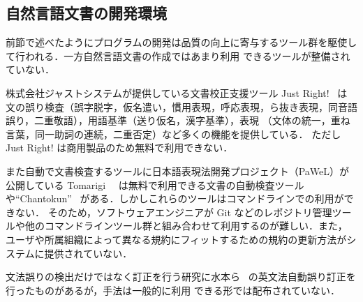 \subsection{自然言語文書の開発環境}
前節で述べたようにプログラムの開発は品質の向上に寄与するツール群を駆使して行われる．一方自然言語文書の作成ではあまり利用
できるツールが整備されていない．

株式会社ジャストシステムが提供している文書校正支援ツール Just Right!~\cite{justright} は
文の誤り検査（誤字脱字，仮名遣い，慣用表現，呼応表現，ら抜き表現，同音語誤り，二重敬語），用語基準（送り仮名，漢字基準），表現
（文体の統一，重ね言葉，同一助詞の連続，二重否定）など多くの機能を提供している．
ただし Just Right! は商用製品のため無料で利用できない．

また自動で文書検査するツールに日本語表現法開発プロジェクト（PaWeL）が公開している Tomarigi~\cite{tomarigi}~\cite{tomarigi-paper} 
は無料で利用できる文書の自動検査ツールや``Chantokun''~\cite{chantokun} がある．しかしこれらのツールはコマンドラインでの利用ができない．
そのため，ソフトウェアエンジニアが Git などのレポジトリ管理ツールや他のコマンドラインツール群と組み合わせて利用するのが難しい．また，
ユーザや所属組織によって異なる規約にフィットするための規約の更新方法がシステムに提供されていない．

文法誤りの検出だけではなく訂正を行う研究に水本ら~\cite{mizumoto12english} の英文法自動誤り訂正を行ったものがあるが，手法は一般的に利用
できる形では配布されていない．

